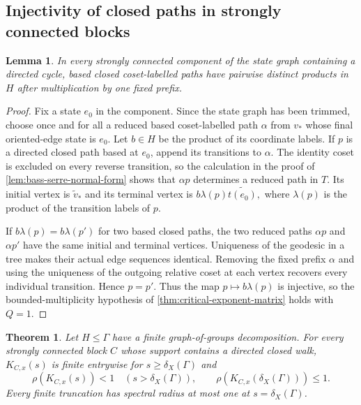 \documentclass[11pt]{article}
\newtheorem{theorem}{Theorem}[section]
\newtheorem{lemma}[lemma]{Lemma}
\theoremstyle{definition}
\begin{document}
\subsection{Injectivity of closed paths in strongly connected blocks}

\begin{lemma}
\label{lem:bass-serre-closed-injective}
In every strongly connected component of the state graph containing a directed cycle, based
closed coset-labelled paths have pairwise distinct products in $H$ after multiplication by one
fixed prefix.
\end{lemma}

\begin{proof}
Fix a state $e_0$ in the component.  Since the state graph has been trimmed, choose once and
for all a reduced based coset-labelled path $\alpha$ from $v_*$ whose final oriented-edge
state is $e_0$.  Let $b\in H$ be the product of its coordinate labels.  If $p$ is a directed
closed path based at $e_0$, append its transitions to $\alpha$.  The identity coset is excluded
on every reverse transition, so the calculation in the proof of
\cref{lem:bass-serre-normal-form} shows that $\alpha p$ determines a reduced path in $T$.
Its initial vertex is $\widetilde v_*$ and its terminal vertex is
$
 b\lambda(p)\widetilde{t(e_0)},
$
where $\lambda(p)$ is the product of the transition labels of $p$.

If $b\lambda(p)=b\lambda(p')$ for two based closed paths, the two reduced paths
$\alpha p$ and $\alpha p'$ have the same initial and terminal vertices.  Uniqueness of the
geodesic in a tree makes their actual edge sequences identical.  Removing the fixed prefix
$\alpha$ and using the uniqueness of the outgoing relative coset at each vertex recovers every
individual transition. Hence $p=p'$.  Thus the map
$p\mapsto b\lambda(p)$ is injective, so the bounded-multiplicity hypothesis of
\cref{thm:critical-exponent-matrix} holds with $Q=1$.
\end{proof}

\begin{theorem}
\label{thm:bass-serre-critical-exponent}
Let $H\le\Gamma$ have a finite graph-of-groups decomposition.  For every strongly connected block $C$ whose support contains a directed closed walk, $K_{C,x}(s)$ is finite entrywise for $s\ge\delta_X(\Gamma)$ and
\begin{equation}\label{eq:bass-serre-critical-exponent}
 \rho(K_{C,x}(s))<1\quad(s>\delta_X(\Gamma)),
 \qquad
 \rho(K_{C,x}(\delta_X(\Gamma)))\le1.
\end{equation}
Every finite truncation has spectral radius at most one at $s=\delta_X(\Gamma)$.
\end{theorem}
\end{document}
